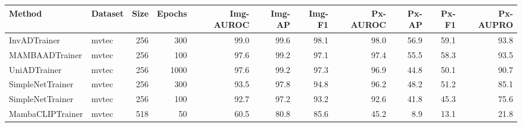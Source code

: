 \begin{tabular}{llrrrrrrrrr}
\toprule
Method & Dataset & Size & Epochs & Img-AUROC & Img-AP & Img-F1 & Px-AUROC & Px-AP & Px-F1 & Px-AUPRO \\
\midrule
InvADTrainer & mvtec & 256 & 300 & 99.0 & 99.6 & 98.1 & 98.0 & 56.9 & 59.1 & 93.8 \\
MAMBAADTrainer & mvtec & 256 & 100 & 97.6 & 99.2 & 97.1 & 97.4 & 55.5 & 58.3 & 93.5 \\
UniADTrainer & mvtec & 256 & 1000 & 97.6 & 99.2 & 97.3 & 96.9 & 44.8 & 50.1 & 90.7 \\
SimpleNetTrainer & mvtec & 256 & 300 & 93.5 & 97.8 & 94.8 & 96.2 & 48.2 & 51.2 & 85.1 \\
SimpleNetTrainer & mvtec & 256 & 100 & 92.7 & 97.2 & 93.2 & 92.6 & 41.8 & 45.3 & 75.6 \\
MambaCLIPTrainer & mvtec & 518 & 50 & 60.5 & 80.8 & 85.6 & 45.2 & 8.9 & 13.1 & 21.8 \\
\bottomrule
\end{tabular}
